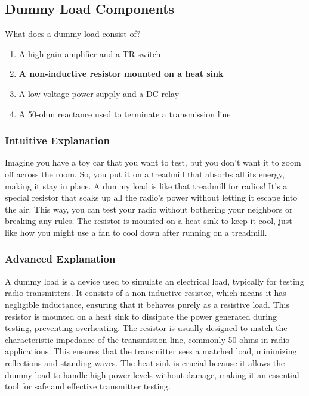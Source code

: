 \subsection{Dummy Load Components}
\label{T7C03}

\begin{tcolorbox}[colback=gray!10!white,colframe=black!75!black,title=T7C03]
What does a dummy load consist of?
\begin{enumerate}[label=\Alph*)]
    \item A high-gain amplifier and a TR switch
    \item \textbf{A non-inductive resistor mounted on a heat sink}
    \item A low-voltage power supply and a DC relay
    \item A 50-ohm reactance used to terminate a transmission line
\end{enumerate}
\end{tcolorbox}

\subsubsection{Intuitive Explanation}
Imagine you have a toy car that you want to test, but you don’t want it to zoom off across the room. So, you put it on a treadmill that absorbs all its energy, making it stay in place. A dummy load is like that treadmill for radios! It’s a special resistor that soaks up all the radio’s power without letting it escape into the air. This way, you can test your radio without bothering your neighbors or breaking any rules. The resistor is mounted on a heat sink to keep it cool, just like how you might use a fan to cool down after running on a treadmill.

\subsubsection{Advanced Explanation}
A dummy load is a device used to simulate an electrical load, typically for testing radio transmitters. It consists of a non-inductive resistor, which means it has negligible inductance, ensuring that it behaves purely as a resistive load. This resistor is mounted on a heat sink to dissipate the power generated during testing, preventing overheating. The resistor is usually designed to match the characteristic impedance of the transmission line, commonly 50 ohms in radio applications. This ensures that the transmitter sees a matched load, minimizing reflections and standing waves. The heat sink is crucial because it allows the dummy load to handle high power levels without damage, making it an essential tool for safe and effective transmitter testing.

